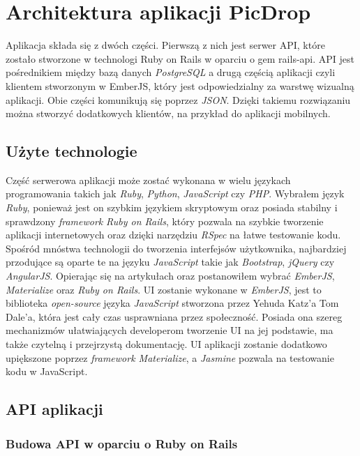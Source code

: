\documentclass[brudnopis]{xmgr}
\begin{document}
\chapter{Architektura aplikacji PicDrop}
Aplikacja składa się z dwóch części. Pierwszą z nich jest serwer API, które zostało stworzone w technologi Ruby on Rails w oparciu o gem rails-api. API jest pośrednikiem między bazą danych \textit{PostgreSQL} a drugą częścią aplikacji czyli klientem stworzonym w EmberJS, który jest odpowiedzialny za warstwę wizualną aplikacji. Obie części komunikują się poprzez \textit{JSON}. Dzięki takiemu rozwiązaniu można stworzyć dodatkowych klientów, na przykład do aplikacji mobilnych.

\section{Użyte technologie}
Część serwerowa aplikacji może zostać wykonana w wielu językach programowania takich jak \textit{Ruby}, \textit{Python}, \textit{JavaScript} czy \textit{PHP}.
Wybrałem język \textit{Ruby}, ponieważ jest on szybkim językiem skryptowym oraz posiada stabilny i sprawdzony \textit{framework} \textit{Ruby on Rails}, który pozwala na szybkie tworzenie aplikacji internetowych oraz dzięki narzędziu \textit{RSpec} na łatwe testowanie kodu.
Spośród mnóstwa technologii do tworzenia interfejsów użytkownika, najbardziej przodujące są oparte te na języku \textit{JavaScript} takie jak \textit{Bootstrap},\textit{ jQuery} czy\\ \textit{AngularJS}. Opierając się na artykułach \cite{} oraz \cite{} postanowiłem wybrać \textit{EmberJS}, \textit{Materialize} oraz \textit{Ruby on Rails}. UI zostanie wykonane w \textit{EmberJS}, jest to  biblioteka  \textit{open-source} języka \textit{JavaScript} stworzona  przez  Yehuda Katz'a  Tom Dale'a, która jest cały czas usprawniana przez społeczność. Posiada ona szereg mechanizmów ułatwiających developerom tworzenie UI na jej podstawie, ma także czytelną i przejrzystą dokumentację. UI aplikacji zostanie dodatkowo upiększone poprzez \textit{framework Materialize}, a \textit{Jasmine} pozwala na testowanie kodu w JavaScript.

\section{API aplikacji}
\subsection{Budowa API w oparciu o Ruby on Rails}
\end{document}
